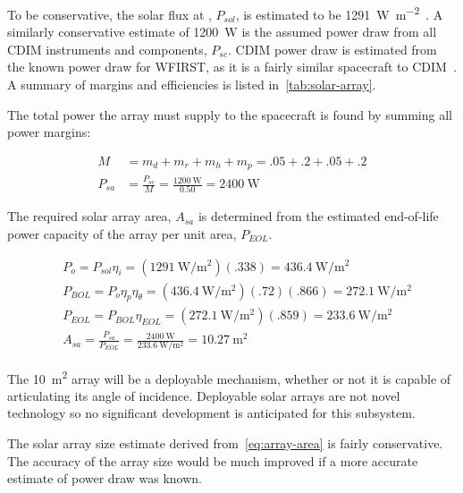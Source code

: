 \documentclass{ws-jai}
\begin{document}
To be conservative, the solar flux at \Ltwo, $P_{sol}$, is estimated to be \SI{1291}{\watt\per\meter\squared}~\cite{evans2002natural}.
A similarly conservative estimate of \SI{1200}{\watt} is the assumed power draw from all CDIM instruments and components, $P_{sc}$.
CDIM power draw is estimated from the known power draw for WFIRST, as it is a fairly similar spacecraft to CDIM~\cite{wfirstFinal2012}.
A summary of margins and efficiencies is listed in~\autoref{tab:solar-array}.

The total power the array must supply to the spacecraft is found by summing all power margins:

\begin{align}
  M &= m_d + m_r + m_h + m_p = .05 +.2 + .05 + .2 \\
  P_{sa} &= \frac{P_{sc}}{M} = \frac{\SI{1200}{\watt}}{0.50} = \SI{2400}{\watt}
\end{align}

The required solar array area, $A_{sa}$ is determined from the estimated end-of-life power capacity of the array per unit area, $P_{EOL}$.

\begin{align}\label{eq:array-area}
  &P_{o} = P_{sol}\eta_i = (\SI{1291}{\watt\per\meter\squared})(.338) = \SI{436.4}{\watt\per\meter\squared} \\
  &P_{BOL} = P_o\eta_p\eta_{\theta} = (\SI{436.4}{\watt\per\meter\squared})(.72)(.866) = \SI{272.1}{\watt\per\meter\squared} \\
  &P_{EOL} = P_{BOL}\eta_{EOL} = (\SI{272.1}{\watt\per\meter\squared})(.859) = \SI{233.6}{\watt\per\meter\squared} \\
  &A_{sa} = \frac{P_{sa}}{P_{EOL}} = \frac{\SI{2400}{\watt}}{\SI{233.6}{\watt\per\meter\squared}} = \SI{10.27}{\meter\squared}
\end{align}

The \SI{10}{\meter\squared} array will be a deployable mechanism, whether or not it is capable of articulating its angle of incidence.
Deployable solar arrays are not novel technology so no significant development is anticipated for this subsystem.


The solar array size estimate derived from~\autoref{eq:array-area} is fairly conservative.
The accuracy of the array size would be much improved if a more accurate estimate of power draw was known.
\end{document}
